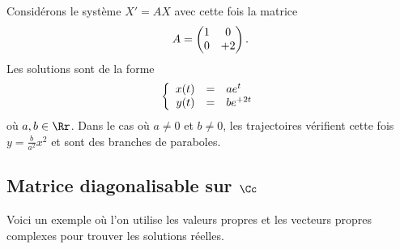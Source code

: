 \documentclass[12pt, class=report,crop=false]{standalone}
\begin{document}
\begin{exemple}
Considérons le système $X'=AX$ avec cette fois la matrice
$$A = \begin{pmatrix}1&0\cr 0&+2\end{pmatrix}.$$
Les solutions sont de la forme 
$$\left\{\begin{array}{rcl}
x(t) &=& ae^t\cr  
y(t) &=& be^{+2t}
\end{array}\right.$$
où $a, b \in \Rr$.
Dans le cas où $a\neq0$ et $b\neq0$, les trajectoires vérifient cette fois
$y = \frac{b}{a^2} x^2$ et sont des branches de paraboles. 


\end{exemple}



\subsection{Matrice diagonalisable sur $\Cc$}

Voici un exemple où l'on utilise les valeurs propres et les vecteurs propres complexes pour trouver les solutions réelles.
\end{document}
